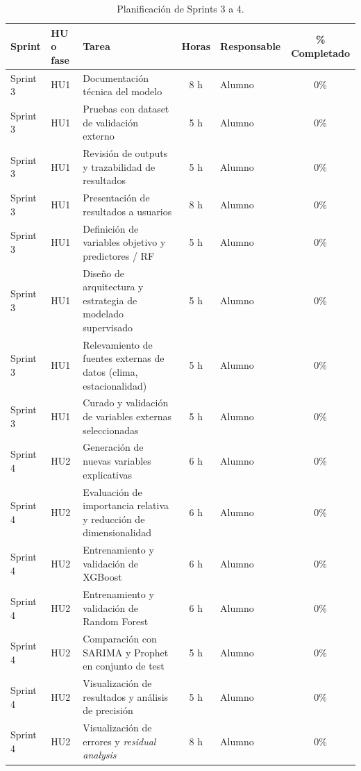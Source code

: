 \documentclass[
11pt, %
]{charter}
\begin{document}
\begin{table}[htpb]
\centering
\caption{Planificación de Sprints 3 a 4.}
\begin{tabularx}{\linewidth}{@{}|l|l|X|c|l|c|@{}}
\hline
\rowcolor[HTML]{C0C0C0}
Sprint & HU o fase & Tarea & Horas & Responsable & \% Completado \\ \hline
Sprint 3 & HU1 & Documentación técnica del modelo & 8 h & Alumno & 0\% \\ \hline
Sprint 3 & HU1 & Pruebas con dataset de validación externo & 5 h & Alumno & 0\% \\ \hline
Sprint 3 & HU1 & Revisión de outputs y trazabilidad de resultados & 5 h & Alumno & 0\% \\ \hline
Sprint 3 & HU1 & Presentación de resultados a usuarios & 8 h & Alumno & 0\% \\ \hline
Sprint 3 & HU1 & Definición de variables objetivo y predictores / RF & 5 h & Alumno & 0\% \\ \hline
Sprint 3 & HU1 & Diseño de arquitectura y estrategia de modelado supervisado & 5 h & Alumno & 0\% \\ \hline
Sprint 3 & HU1 & Relevamiento de fuentes externas de datos (clima, estacionalidad) & 5 h & Alumno & 0\% \\ \hline
Sprint 3 & HU1 & Curado y validación de variables externas seleccionadas & 5 h & Alumno & 0\% \\ \hline
\hline
Sprint 4 & HU2 & Generación de nuevas variables explicativas & 6 h & Alumno & 0\% \\ \hline
Sprint 4 & HU2 & Evaluación de importancia relativa y reducción de dimensionalidad & 6 h & Alumno & 0\% \\ \hline
Sprint 4 & HU2 & Entrenamiento y validación de XGBoost & 6 h & Alumno & 0\% \\ \hline
Sprint 4 & HU2 & Entrenamiento y validación de Random Forest & 6 h & Alumno & 0\% \\ \hline
Sprint 4 & HU2 & Comparación con SARIMA y Prophet en conjunto de test & 5 h & Alumno & 0\% \\ \hline
Sprint 4 & HU2 & Visualización de resultados y análisis de precisión & 5 h & Alumno & 0\% \\ \hline
Sprint 4 & HU2 & Visualización de errores y \textit{residual analysis} & 8 h & Alumno & 0\% \\ \hline
\end{tabularx}
\end{table}
\end{document}
